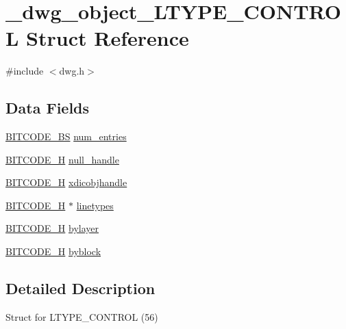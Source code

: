 \hypertarget{struct__dwg__object__LTYPE__CONTROL}{\section{\-\_\-dwg\-\_\-object\-\_\-\-L\-T\-Y\-P\-E\-\_\-\-C\-O\-N\-T\-R\-O\-L \-Struct \-Reference}
\label{struct__dwg__object__LTYPE__CONTROL}
}


{\ttfamily \#include $<$dwg.\-h$>$}

\subsection*{\-Data \-Fields}
\begin{DoxyCompactItemize}
\item 
\hyperlink{dwg_8h_a94297606fbd4a4ff97e8add284af0809}{\-B\-I\-T\-C\-O\-D\-E\-\_\-\-B\-S} \hyperlink{struct__dwg__object__LTYPE__CONTROL_a8ae11e0df908041d2f864e8915415e23}{num\-\_\-entries}
\item 
\hyperlink{dwg_8h_a7c700e94e047a97ba8c24bdfe4029dc3}{\-B\-I\-T\-C\-O\-D\-E\-\_\-\-H} \hyperlink{struct__dwg__object__LTYPE__CONTROL_ab508966d683c45405ac5af8c8576ecb4}{null\-\_\-handle}
\item 
\hyperlink{dwg_8h_a7c700e94e047a97ba8c24bdfe4029dc3}{\-B\-I\-T\-C\-O\-D\-E\-\_\-\-H} \hyperlink{struct__dwg__object__LTYPE__CONTROL_afb7078133a19aaf654f6b05b1db54012}{xdicobjhandle}
\item 
\hyperlink{dwg_8h_a7c700e94e047a97ba8c24bdfe4029dc3}{\-B\-I\-T\-C\-O\-D\-E\-\_\-\-H} $\ast$ \hyperlink{struct__dwg__object__LTYPE__CONTROL_af281620ece91a659e155049d44f110d0}{linetypes}
\item 
\hyperlink{dwg_8h_a7c700e94e047a97ba8c24bdfe4029dc3}{\-B\-I\-T\-C\-O\-D\-E\-\_\-\-H} \hyperlink{struct__dwg__object__LTYPE__CONTROL_a8df79664278bf31231896fd5b595217e}{bylayer}
\item 
\hyperlink{dwg_8h_a7c700e94e047a97ba8c24bdfe4029dc3}{\-B\-I\-T\-C\-O\-D\-E\-\_\-\-H} \hyperlink{struct__dwg__object__LTYPE__CONTROL_a289686a850ebba44ff124eb71e22eb15}{byblock}
\end{DoxyCompactItemize}


\subsection{\-Detailed \-Description}
\-Struct for \-L\-T\-Y\-P\-E\-\_\-\-C\-O\-N\-T\-R\-O\-L (56) 


